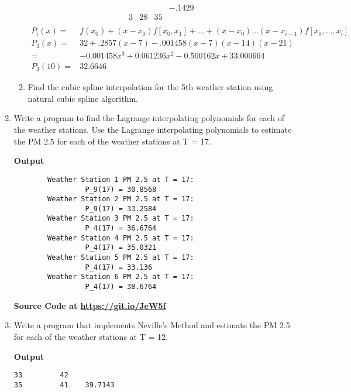 \documentclass{exam}
\begin{document}
\begin{enumerate}
\begin{enumerate}
\begin{equation*}
\begin{array}{cccccc}
                  &     &       & -.1429\\
                3 & 28  & 35\\
            \end{array}
        \end{equation*}
        \begin{align*}
            P_i(x)=&f(x_0)+(x-x_0)f[x_0,x_1]+...+(x-x_0)...(x-x_{i-1})f[x_0,...,x_i]\\
            P_3(x)=&32 + .2857(x-7) - .001458(x-7)(x-14)(x-21)\\
            =&-0.001458x^3+0.061236x^2-0.500162x+33.000664\\
            P_3(10)=&\mathbf{32.6646}
        \end{align*}
        \newpage
        \item Find the cubic spline interpolation for the 5th weather station using natural cubic spline algorithm.
    \end{enumerate}
    \newpage
    \item  Write a program to find the Lagrange interpolating polynomials for each of the weather stations. Use the Lagrange interpolating polynomials to estimate the PM 2.5 for each of the weather stations at T = 17.
    \begin{center}
        \textbf{Output}
    \end{center}
    \begin{verbatim}
        Weather Station 1 PM 2.5 at T = 17:
                 P_9(17) = 30.8568
        Weather Station 2 PM 2.5 at T = 17:
                 P_9(17) = 33.2584
        Weather Station 3 PM 2.5 at T = 17:
                 P_4(17) = 36.6764
        Weather Station 4 PM 2.5 at T = 17:
                 P_4(17) = 35.0321
        Weather Station 5 PM 2.5 at T = 17:
                 P_4(17) = 33.136
        Weather Station 6 PM 2.5 at T = 17:
                 P_4(17) = 38.6764
    \end{verbatim}
    \begin{center}
        \textbf{Source Code at \url{https://git.io/JeW5f}}
    \end{center}
    \newpage
    \item  Write a program that implements Neville's Method and estimate the PM 2.5 for each of the weather stations at T = 12.
    \begin{center}
        \textbf{Output}
    \end{center}
    \begin{verbatim}
33         42
35         41    39.7143

\end{verbatim}
\end{enumerate}
\end{document}
